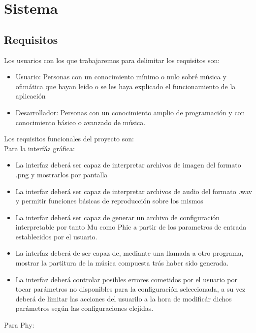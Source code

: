 \chapter{Sistema}


\section{Requisitos}
Los usuarios con los que trabajaremos para delimitar los requisitos son:
\begin{itemize}
	\item Usuario: Personas con un conocimiento mínimo o nulo sobré música y ofimática que hayan leído o se les haya explicado el funcionamiento de la aplicación
	\item Desarrollador: Personas con un conocimiento amplio de programación y con conocimiento básico o avanzado de música.
\end{itemize}
Los requisitos funcionales del proyecto son:
\\Para la interfáz gráfica:
 \begin{itemize}
	 \item La interfaz deberá ser capaz de interpretar archivos de imagen del formato .png y mostrarlos por pantalla
	 \item La interfaz deberá ser capaz de interpretar archivos de audio del formato .wav y permitir funciones básicas de reproducción sobre los mismos
	 \item La interfaz deberá ser capaz de generar un archivo de configuración interpretable por tanto Mu como Phic a partir de los parametros de entrada establecidos por el usuario.
	 \item La interfaz deberá de ser capaz de, mediante una llamada a otro programa, mostrar la partitura de la música compuesta trás haber sido generada.
	 \item La interfaz deberá controlar posibles errores cometidos por el usuario por tocar parámetros no disponibles para la configuración seleccionada, a su vez deberá de limitar las acciones del usuarilo a la hora de modificár dichos parámetros según las configuraciones elejidas.
 \end{itemize}
 Para Phy:
